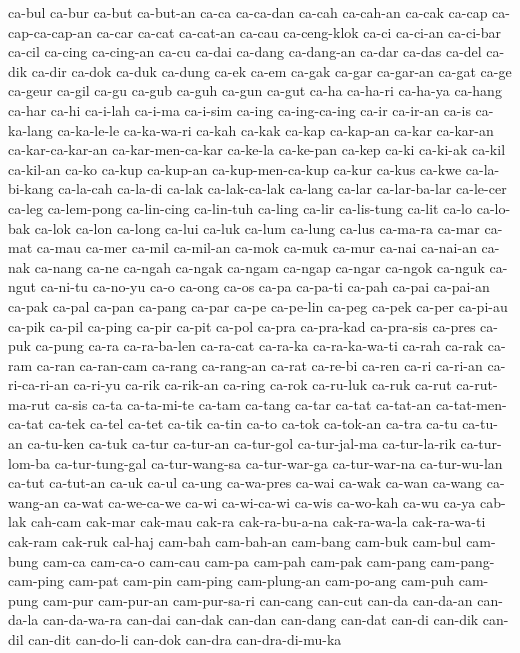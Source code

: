 {ca-bul ca-bur ca-but ca-but-an ca-ca ca-ca-dan ca-cah ca-cah-an ca-cak
ca-cap ca-cap-ca-cap-an ca-car ca-cat ca-cat-an ca-cau ca-ceng-klok ca-ci
ca-ci-an ca-ci-bar ca-cil ca-cing ca-cing-an ca-cu ca-dai ca-dang
ca-dang-an ca-dar ca-das ca-del ca-dik ca-dir ca-dok ca-duk ca-dung ca-ek
ca-em ca-gak ca-gar ca-gar-an ca-gat ca-ge ca-geur ca-gil ca-gu ca-gub
ca-guh ca-gun ca-gut ca-ha ca-ha-ri ca-ha-ya ca-hang ca-har ca-hi ca-i-lah
ca-i-ma ca-i-sim ca-ing ca-ing-ca-ing ca-ir ca-ir-an ca-is ca-ka-lang
ca-ka-le-le ca-ka-wa-ri ca-kah ca-kak ca-kap ca-kap-an ca-kar ca-kar-an
ca-kar-ca-kar-an ca-kar-men-ca-kar ca-ke-la ca-ke-pan ca-kep ca-ki
ca-ki-ak ca-kil ca-kil-an ca-ko ca-kup ca-kup-an ca-kup-men-ca-kup ca-kur
ca-kus ca-kwe ca-la-bi-kang ca-la-cah ca-la-di ca-lak ca-lak-ca-lak
ca-lang ca-lar ca-lar-ba-lar ca-le-cer ca-leg ca-lem-pong ca-lin-cing
ca-lin-tuh ca-ling ca-lir ca-lis-tung ca-lit ca-lo ca-lo-bak ca-lok ca-lon
ca-long ca-lui ca-luk ca-lum ca-lung ca-lus ca-ma-ra ca-mar ca-mat ca-mau
ca-mer ca-mil ca-mil-an ca-mok ca-muk ca-mur ca-nai ca-nai-an ca-nak
ca-nang ca-ne ca-ngah ca-ngak ca-ngam ca-ngap ca-ngar ca-ngok ca-nguk
ca-ngut ca-ni-tu ca-no-yu ca-o ca-ong ca-os ca-pa ca-pa-ti ca-pah ca-pai
ca-pai-an ca-pak ca-pal ca-pan ca-pang ca-par ca-pe ca-pe-lin ca-peg
ca-pek ca-per ca-pi-au ca-pik ca-pil ca-ping ca-pir ca-pit ca-pol ca-pra
ca-pra-kad ca-pra-sis ca-pres ca-puk ca-pung ca-ra ca-ra-ba-len ca-ra-cat
ca-ra-ka ca-ra-ka-wa-ti ca-rah ca-rak ca-ram ca-ran ca-ran-cam ca-rang
ca-rang-an ca-rat ca-re-bi ca-ren ca-ri ca-ri-an ca-ri-ca-ri-an ca-ri-yu
ca-rik ca-rik-an ca-ring ca-rok ca-ru-luk ca-ruk ca-rut ca-rut-ma-rut
ca-sis ca-ta ca-ta-mi-te ca-tam ca-tang ca-tar ca-tat ca-tat-an
ca-tat-men-ca-tat ca-tek ca-tel ca-tet ca-tik ca-tin ca-to ca-tok
ca-tok-an ca-tra ca-tu ca-tu-an ca-tu-ken ca-tuk ca-tur ca-tur-an
ca-tur-gol ca-tur-jal-ma ca-tur-la-rik ca-tur-lom-ba ca-tur-tung-gal
ca-tur-wang-sa ca-tur-war-ga ca-tur-war-na ca-tur-wu-lan ca-tut ca-tut-an
ca-uk ca-ul ca-ung ca-wa-pres ca-wai ca-wak ca-wan ca-wang ca-wang-an
ca-wat ca-we-ca-we ca-wi ca-wi-ca-wi ca-wis ca-wo-kah ca-wu ca-ya cab-lak
cah-cam cak-mar cak-mau cak-ra cak-ra-bu-a-na cak-ra-wa-la cak-ra-wa-ti
cak-ram cak-ruk cal-haj cam-bah cam-bah-an cam-bang cam-buk cam-bul
cam-bung cam-ca cam-ca-o cam-cau cam-pa cam-pah cam-pak cam-pang
cam-pang-cam-ping cam-pat cam-pin cam-ping cam-plung-an cam-po-ang cam-puh
cam-pung cam-pur cam-pur-an cam-pur-sa-ri can-cang can-cut can-da
can-da-an can-da-la can-da-wa-ra can-dai can-dak can-dan can-dang can-dat
can-di can-dik can-dil can-dit can-do-li can-dok can-dra can-dra-di-mu-ka
}
